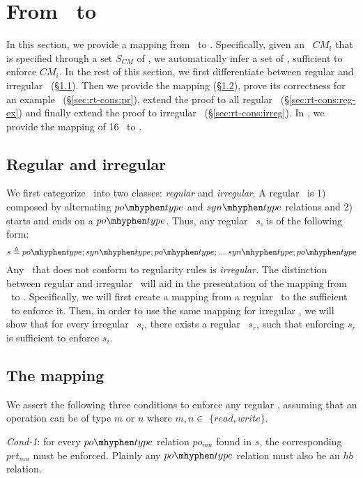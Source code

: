 \section{From \mcms\ to \rts}\label{sec:rt-cons}

In this section, we provide a mapping from \mcms\ to \rts.
Specifically,
given an \mcm\ $CM_i$ that is specified through a set $S_{CM}$ of \synpats, we automatically infer a set of \rts, sufficient to enforce $CM_i$. 
In the rest of this section, we first differentiate between regular and irregular \synpats\ (\S\ref{sec:rt-cons:reg}). Then we provide the mapping (\S\ref{sec:rt-cons:map}), prove its correctness for an example \synpat\ (\S\ref{sec:rt-cons:pr}), extend the proof to all regular \synpats\ (\S\ref{sec:rt-cons:reg-ex}) and finally extend the proof to irregular \synpats\ (\S\ref{sec:rt-cons:irreg}).
In , we provide the mapping of 16 \synpats\ to \rts.
 
\subsection{Regular and irregular \synpats} \label{sec:rt-cons:reg}

We first categorize \synpats\ into two classes: \emph{regular} and \emph{irregular}.
A regular \synpat\ is 1) composed by alternating $\potype$ and $\syntype$ relations and 2) starts and ends on a $\potype$. Thus, any regular \synpat\ $s$, is of the following form:
\begin{equation*}
    s \triangleq \potype ; \syntype; \potype; ...\ \syntype; \potype
\end{equation*}
Any \synpat\ that does not conform to regularity rules is \emph{irregular}.
The distinction between regular and irregular \synpats\ will aid in the  presentation of the mapping from \synpats\ to \rts. Specifically, we will first create a mapping from a regular \synpat\ to the sufficient \rts\ to enforce it. Then, in order to use the same mapping for irregular \synpats, we will show that for every irregular \synpat\ $s_i$, there exists a regular \synpat\ $s_r$, such that enforcing $s_r$ is sufficient to enforce $s_i$. 


\subsection{The mapping} \label{sec:rt-cons:map}

We assert the following three conditions to enforce any regular \synpat, assuming that an operation can be of type $m$ or $n$ where $m, n \in$ $\{read, write\}$.
\squishlist
\item \emph{Cond-1}: for every $\potype$ relation $po_{mn}$ found in $s$, the corresponding \prt\ $prt_{mn}$ must be enforced. Plainly any $\potype$ relation must also be an $hb$ relation. 

